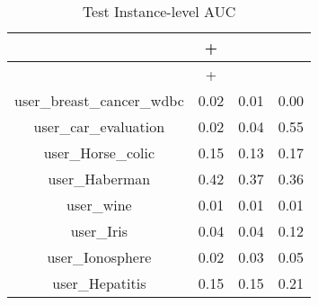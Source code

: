 \begin{table}[ht]\footnotesize
\centering
\caption{Test Instance-level AUC}
\label{Table:mil_test_instance_AUC}
\begin{tabular}{|c|c|c|c|}
  \hline
          &\RB{}+  &  \CRB{}  &  \RB{}\\ 
  \hline
\begin{table}[ht]\footnotesize
\centering
\begin{table}[ht]\footnotesize
\centering
\caption{Test Ranking Error}
\label{Table:mil_test_error}
\begin{tabular}{|c|c|c|c|}
  \hline
          &\RB{}+  &  \CRB{}  &  \RB{}\\ 
  \hline
user_breast_cancer_wdbc  &  0.02   &  0.01   &  0.00 \\ 
user_car_evaluation  &  0.02   &  0.04   &  0.55 \\ 
user_Horse_colic  &  0.15   &  0.13   &  0.17 \\ 
user_Haberman  &  0.42   &  0.37   &  0.36 \\ 
user_wine  &  0.01   &  0.01   &  0.01 \\ 
user_Iris  &  0.04   &  0.04   &  0.12 \\ 
user_Ionosphere  &  0.02   &  0.03   &  0.05 \\ 
user_Hepatitis  &  0.15   &  0.15   &  0.21 \\ 
\hline
 \end{tabular}
  \end{table}


